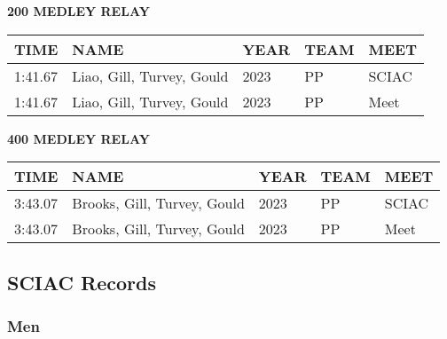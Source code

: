 \vspace{0.4cm}

\begin{center}
\begin{minipage}[t]{0.7\textwidth}
\centering
\textbf{200 MEDLEY RELAY}\\[0.05cm]
\begin{tabular}{@{}p{1.8cm}p{2.8cm}p{1.2cm}p{1.4cm}p{1.4cm}@{}}
\hline
\textbf{TIME} & \textbf{NAME} & \textbf{YEAR} & \textbf{TEAM} & \textbf{MEET} \\
\hline
1:41.67 & Liao, Gill, Turvey, Gould & 2023 & PP & SCIAC \\
1:41.67 & Liao, Gill, Turvey, Gould & 2023 & PP & Meet \\
\hline
\end{tabular}
\end{minipage}
\end{center}

\vspace{0.4cm}

\begin{center}
\begin{minipage}[t]{0.7\textwidth}
\centering
\textbf{400 MEDLEY RELAY}\\[0.05cm]
\begin{tabular}{@{}p{1.8cm}p{2.8cm}p{1.2cm}p{1.4cm}p{1.4cm}@{}}
\hline
\textbf{TIME} & \textbf{NAME} & \textbf{YEAR} & \textbf{TEAM} & \textbf{MEET} \\
\hline
3:43.07 & Brooks, Gill, Turvey, Gould & 2023 & PP & SCIAC \\
3:43.07 & Brooks, Gill, Turvey, Gould & 2023 & PP & Meet \\
\hline
\end{tabular}
\end{minipage}
\end{center}

\vspace{0.4cm}

\newpage

\subsection{SCIAC Records}
\subsubsection{Men}

